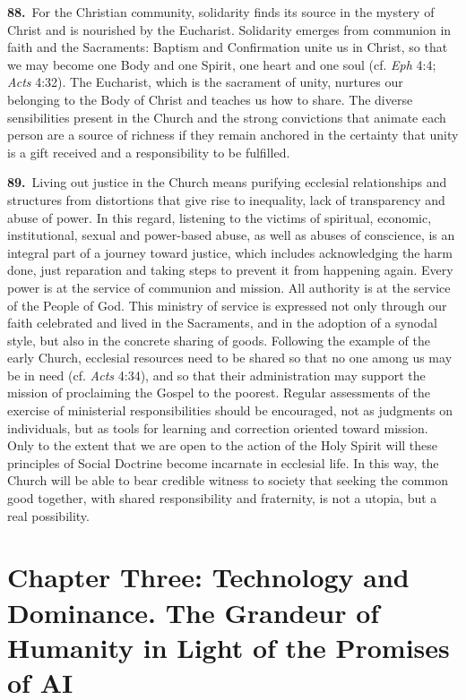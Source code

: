 \documentclass{article}
\begin{document}
\textbf{88.}\ For the Christian community, solidarity finds its source in the mystery of Christ and is nourished by the Eucharist. Solidarity emerges from communion in faith and the Sacraments: Baptism and Confirmation unite us in Christ, so that we may become one Body and one Spirit, one heart and one soul (cf. \emph{Eph} 4:4; \emph{Acts} 4:32). The Eucharist, which is the sacrament of unity, nurtures our belonging to the Body of Christ and teaches us how to share. The diverse sensibilities present in the Church and the strong convictions that animate each person are a source of richness if they remain anchored in the certainty that unity is a gift received and a responsibility to be fulfilled.

\textbf{89.}\ Living out justice in the Church means purifying ecclesial relationships and structures from distortions that give rise to inequality, lack of transparency and abuse of power. In this regard, listening to the victims of spiritual, economic, institutional, sexual and power-based abuse, as well as abuses of conscience, is an integral part of a journey toward justice, which includes acknowledging the harm done, just reparation and taking steps to prevent it from happening again. Every power is at the service of communion and mission. All authority is at the service of the People of God. This ministry of service is expressed not only through our faith celebrated and lived in the Sacraments, and in the adoption of a synodal style, but also in the concrete sharing of goods. Following the example of the early Church, ecclesial resources need to be shared so that no one among us may be in need (cf. \emph{Acts} 4:34), and so that their administration may support the mission of proclaiming the Gospel to the poorest. Regular assessments of the exercise of ministerial responsibilities should be encouraged, not as judgments on individuals, but as tools for learning and correction oriented toward mission.\cite{n116} Only to the extent that we are open to the action of the Holy Spirit will these principles of Social Doctrine become incarnate in ecclesial life. In this way, the Church will be able to bear credible witness to society that seeking the common good together, with shared responsibility and fraternity, is not a utopia, but a real possibility.\cite{n117}

\section{Chapter Three: Technology and Dominance. The Grandeur of Humanity in Light of the Promises of AI}
\end{document}
